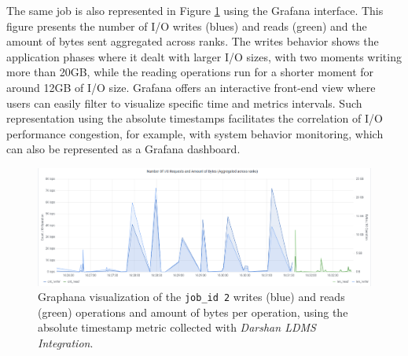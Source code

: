 The same job is also represented in Figure \ref{f:mpi_io_grafana}
using the Grafana interface. This figure presents the number of I/O
writes (blues) and reads (green) and the amount of bytes sent
aggregated across ranks. The writes behavior shows the application
phases where it dealt with larger I/O sizes, with two moments writing
more than 20GB, while the reading operations run for a shorter moment
for around 12GB of I/O size. Grafana offers an interactive front-end
view where users can easily filter to visualize specific time and
metrics intervals. Such representation using the absolute timestamps
facilitates the correlation of I/O performance congestion, for
example, with system behavior monitoring, which can also be
represented as a Grafana dashboard.

\begin{figure}
	\centering
	\includegraphics[width=1\textwidth]{figs/255653_mpi_io_luster_no_coll.pdf}
	\caption{Graphana visualization of the \texttt{job\_id 2}
          writes (blue) and reads (green) operations and amount of bytes per
          operation, using the absolute timestamp metric collected
          with \emph{Darshan LDMS Integration}. }%
	\label{f:mpi_io_grafana}
\end{figure}
